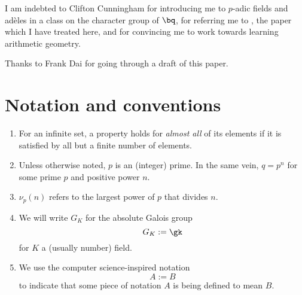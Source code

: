 I am indebted to Clifton Cunningham for introducing me to $p$-adic fields and
ad\`eles in a class on the character group of $\bq$, for referring me to
\cite{artinwhaples}, the paper which I have treated here, and for convincing me
to work towards learning arithmetic geometry.

Thanks to Frank Dai for going through a draft of this paper.

\section*{Notation and conventions}
\begin{enumerate}
\item For an infinite set, a property holds for \textit{almost all} of its
  elements if it is satisfied by all but a finite number of elements.
\item Unless otherwise noted, $p$ is an (integer) prime. In the same vein, $q=
  p^n$ for some prime $p$ and positive power $n$.
\item $\nu_p(n)$ refers to the largest power of $p$ that divides $n$.
\item We will write $G_K$ for the absolute Galois group
  \[ G_K := \gk \]
  for $K$ a (usually number) field.
\item We use the computer science-inspired notation
  \[ A := B \]
  to indicate that some piece of notation $A$ is being defined to mean $B$.
\end{enumerate}
